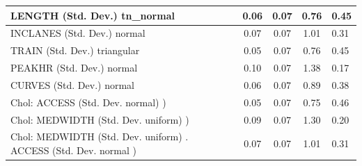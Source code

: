 \begin{table}
\begin{center}
\begin{tabular}{|l|l|c|c|c|l|}
			\hline
			LENGTH (Std. Dev.) tn_normal &  & 0.06 & 0.07 & 0.76 & 0.45 \\
			\hline
			INCLANES (Std. Dev.) normal &  & 0.07 & 0.07 & 1.01 & 0.31 \\
			\hline
			TRAIN (Std. Dev.) triangular &  & 0.05 & 0.07 & 0.76 & 0.45 \\
			\hline
			PEAKHR (Std. Dev.) normal &  & 0.10 & 0.07 & 1.38 & 0.17 \\
			\hline
			CURVES (Std. Dev.) normal &  & 0.06 & 0.07 & 0.89 & 0.38 \\
			\hline
			 Chol: ACCESS (Std. Dev. normal) ) &  & 0.05 & 0.07 & 0.75 & 0.46 \\
			\hline
			 Chol: MEDWIDTH (Std. Dev. uniform) ) &  & 0.09 & 0.07 & 1.30 & 0.20 \\
			\hline
			 Chol: MEDWIDTH (Std. Dev. uniform) . ACCESS (Std. Dev.   normal ) &  & 0.07 & 0.07 & 1.01 & 0.31 \\
			\hline
		\end{tabular}
	\end{center}
\end{table}
